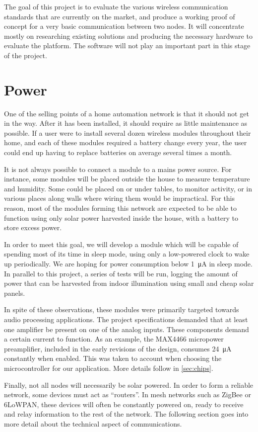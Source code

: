The goal of this project is to evaluate the various wireless communication
standards that are currently on the market, and produce a working proof of
concept for a very basic communication between two nodes. It will concentrate
mostly on researching existing solutions and producing the necessary hardware to
evaluate the platform. The software will not play an important part in this
stage of the project.

\section{Power}\label{sec:power}

One of the selling points of a home automation network is that it should not get
in the way. After it has been installed, it should require as little maintenance
as possible. If a user were to install several dozen wireless modules throughout
their home, and each of these modules required a battery change every year, the
user could end up having to replace batteries on average several times a month. 

It is not always possible to connect a module to a mains power source. For
instance, some modules will be placed outside the house to measure temperature
and humidity. Some could be placed on or under tables, to monitor activity, or
in various places along walls where wiring them would be impractical. For this
reason, most of the modules forming this network are expected to be able to
function using only solar power harvested inside the house, with a battery to
store excess power.

In order to meet this goal, we will develop a module which will be capable of
spending most of its time in sleep mode, using only a low-powered clock to wake
up periodically. We are hoping for power consumption below
\SI{1}{\micro\ampere} in sleep mode. In parallel to this project, a series of
tests will be run, logging the amount of power that can be harvested from indoor
illumination using small and cheap solar panels.

In spite of these observations, these modules were primarily targeted towards
audio processing applications. The project specifications demanded that at least
one amplifier be present on one of the analog inputs. These components demand
a certain current to function. As an example, the MAX4466 micropower
preamplifier, included in the early revisions of the design, consumes
\SI{24}{\micro\ampere} constantly when enabled. This was taken to account when
choosing the microcontroller for our application. More details follow in
\autoref{sec:chips}.

Finally, not all nodes will necessarily be solar powered. In order to form
a reliable network, some devices must act as ``routers''. In mesh networks such
as ZigBee or \ac{6LoWPAN}, these devices will often be constantly powered on,
ready to receive and relay information to the rest of the network. The following
section goes into more detail about the technical aspect of communications.

